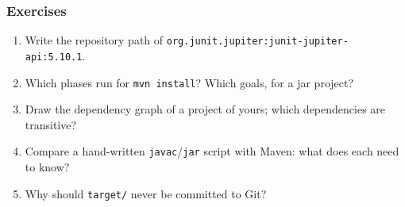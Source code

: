 \documentclass[aspectratio=169,10pt,compress]{beamer}
\begin{document}
\begin{frame}[t,fragile] \frametitle{Exercises}
  \begin{enumerate}\small
    \item Write the repository path of \texttt{org.junit.jupiter:junit-jupiter-api:5.10.1}.
    \item Which phases run for \texttt{mvn install}? Which goals, for a jar project?
    \item Draw the dependency graph of a project of yours; which dependencies are transitive?
    \item Compare a hand-written \texttt{javac}/\texttt{jar} script with Maven: what does each need to know?
    \item Why should \texttt{target/} never be committed to Git?
  \end{enumerate}
\end{frame}




\begin{frame}[t,fragile]
	\begin{center}
		\vspace{4cm}
	\end{center}
\end{frame}
\end{document}
